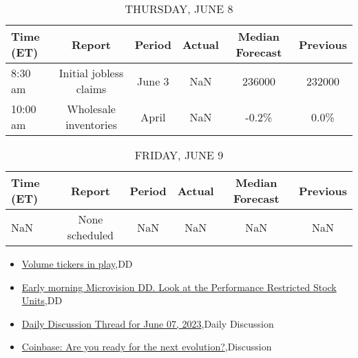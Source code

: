 \documentclass{article}%
\begin{document}
%


\begin{table}[htbp]%
\caption{THURSDAY, JUNE 8}%
\centering%
\begin{adjustbox}{width=1\textwidth}%
\begin{tabular}{lccccc}
\toprule
Time (ET) &                 Report & Period & Actual & Median Forecast & Previous \\
\midrule
  8:30 am & Initial jobless claims & June 3 &    NaN &          236000 &   232000 \\
 10:00 am &  Wholesale inventories &  April &    NaN &           -0.2\% &     0.0\% \\
\bottomrule
\end{tabular}
%
\end{adjustbox}%
\end{table}

%


\begin{table}[htbp]%
\caption{FRIDAY, JUNE 9}%
\centering%
\begin{adjustbox}{width=1\textwidth}%
\begin{tabular}{lccccc}
\toprule
Time (ET) &         Report & Period & Actual & Median Forecast & Previous \\
\midrule
      NaN & None scheduled &    NaN &    NaN &             NaN &      NaN \\
\bottomrule
\end{tabular}
%
\end{adjustbox}%
\end{table}

%
\begin{itemize}%
\item%
\href{https://reddit.com/r/wallstreetbets/comments/143bbkf/volume\_tickers\_in\_play/}{Volume tickers in play},DD%
\item%
\href{https://reddit.com/r/wallstreetbets/comments/143a2a4/early\_morning\_microvision\_dd\_look\_at\_the/}{Early morning Microvision DD. Look at the Performance Restricted Stock Units},DD%
\item%
\href{https://reddit.com/r/wallstreetbets/comments/1438yxm/daily\_discussion\_thread\_for\_june\_07\_2023/}{Daily Discussion Thread for June 07, 2023},Daily Discussion%
\item%
\href{https://reddit.com/r/wallstreetbets/comments/1434e2e/coinbase\_are\_you\_ready\_for\_the\_next\_evolution/}{Coinbase: Are you ready for the next evolution?},Discussion%
\end{itemize}%
\end{document}
